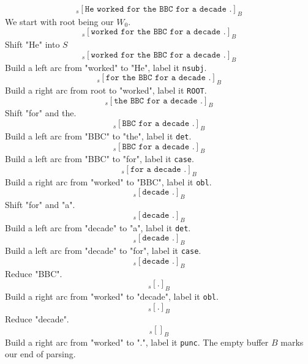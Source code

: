 \documentclass[11pt]{article} %
\begin{document}
\begin{equation}
  [\texttt{ROOT}]_s [\texttt{He worked for the BBC for a decade .}]_B
\end{equation}
We start with root being our $W_0$.
\begin{equation}
  [\texttt{ROOT He}]_s [\texttt{worked for the BBC for a decade .}]_B
\end{equation}
Shift "He" into $S$
\begin{equation}
  [\texttt{ROOT}]_s [\texttt{worked for the BBC for a decade .}]_B
\end{equation}
Build a left arc from "worked" to "He", label it \texttt{nsubj}.
\begin{equation}
  [\texttt{ROOT worked}]_s [\texttt{for the BBC for a decade .}]_B
\end{equation}
Build a right arc from root to "worked", label it \texttt{ROOT}.
\begin{equation}
  [\texttt{ROOT worked for the}]_s [\texttt{the BBC for a decade .}]_B
\end{equation}
Shift "for" and the.
\begin{equation}
  [\texttt{ROOT worked for}]_s [\texttt{BBC for a decade .}]_B
\end{equation}
Build a left arc from "BBC" to "the", label it \texttt{det}.
\begin{equation}
  [\texttt{ROOT worked}]_s [\texttt{BBC for a decade .}]_B
\end{equation}
Build a left arc from "BBC" to "for", label it \texttt{case}.
\begin{equation}
  [\texttt{ROOT worked BBC}]_s [\texttt{for a decade .}]_B
\end{equation}
Build a right arc from "worked" to "BBC", label it \texttt{obl}.
\begin{equation}
  [\texttt{ROOT worked BBC for a}]_s [\texttt{decade .}]_B
\end{equation}
Shift "for" and "a".
\begin{equation}
  [\texttt{ROOT worked BBC for}]_s [\texttt{decade .}]_B
\end{equation}
Build a left arc from "decade" to "a", label it \texttt{det}.
\begin{equation}
  [\texttt{ROOT worked BBC}]_s [\texttt{decade .}]_B
\end{equation}
Build a left arc from "decade" to "for", label it \texttt{case}.
\begin{equation}
  [\texttt{ROOT worked}]_s [\texttt{decade .}]_B
\end{equation}
Reduce "BBC".
\begin{equation}
  [\texttt{ROOT worked decade}]_s [\texttt{.}]_B
\end{equation}
Build a right arc from "worked" to "decade", label it \texttt{obl}.
\begin{equation}
  [\texttt{ROOT worked}]_s [\texttt{.}]_B
\end{equation}
Reduce "decade".
\begin{equation}
  [\texttt{ROOT worked .}]_s []_B
\end{equation}
Build a right arc from "worked" to ".", label it \texttt{punc}. The empty buffer $B$ marks our end of parsing.
\end{document}
